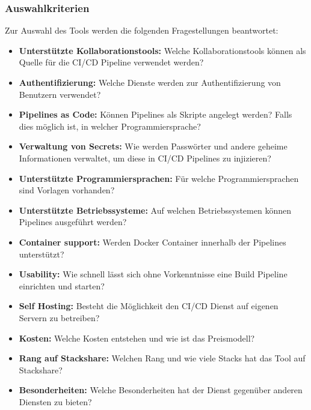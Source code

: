 \subsubsection{Auswahlkriterien}\label{ci_services_kriterien}

Zur Auswahl des Tools werden die folgenden Fragestellungen beantwortet:


\begin{itemize}
    \item \textbf{Unterstützte Kollaborationstools:}
    Welche Kollaborationstools können als Quelle für die CI/CD Pipeline verwendet werden?

    \item \textbf{Authentifizierung:}
    Welche Dienste werden zur Authentifizierung von Benutzern verwendet?

    \item \textbf{Pipelines as Code:}
    Können Pipelines als Skripte angelegt werden?
    Falls dies möglich ist, in welcher Programmiersprache?

    \item \textbf{Verwaltung von Secrets:}
    Wie werden Passwörter und andere geheime Informationen verwaltet, um diese in CI/CD Pipelines zu injizieren?

    \item \textbf{Unterstützte Programmiersprachen:}
    Für welche Programmiersprachen sind Vorlagen vorhanden?

    \item \textbf{Unterstützte Betriebssysteme:}
    Auf welchen Betriebssystemen können Pipelines ausgeführt werden?

    \item \textbf{Container support:}
    Werden Docker Container innerhalb der Pipelines unterstützt?

    \item \textbf{Usability:}
    Wie schnell lässt sich ohne Vorkenntnisse eine Build Pipeline einrichten und starten?

    \item \textbf{Self Hosting:}
    Besteht die Möglichkeit den CI/CD Dienst auf eigenen Servern zu betreiben?

    \item \textbf{Kosten:}
    Welche Kosten entstehen und wie ist das Preismodell?

    \item \textbf{Rang auf Stackshare:}
    Welchen Rang und wie viele Stacks hat das Tool auf Stackshare?

    \item \textbf{Besonderheiten:}
    Welche Besonderheiten hat der Dienst gegenüber anderen Diensten zu bieten?
\end{itemize}
